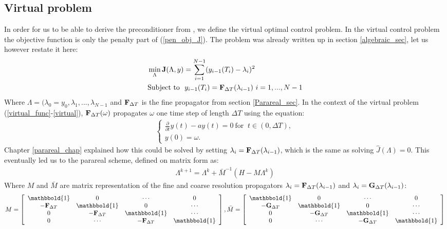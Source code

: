 \subsection{Virtual problem}
In order for us to be able to derive the preconditioner from \cite{maday2002parareal}, we define the virtual optimal control problem. In the virtual control problem the objective function is only the penalty part of (\ref{pen_obj_J}). The problem was already written up in section \ref{algebraic_sec}, let us however restate it here:
\begin{align}
&\min_{\Lambda}\bold{J}(\Lambda,y) = \sum_{i=1}^{N-1} (y_{i-1}(T_{i})-\lambda_{i})^2 \label{virtual_func} \\
&\textrm{Subject to } \ y_{i-1}(T_{i}) = \bold F_{\Delta T}(\lambda_{i-1}) \ i=1,...,N-1 \label{virtual}
\end{align}
Where $\Lambda=(\lambda_0=y_0,\lambda_1,...,\lambda_ {N-1}$ and $\bold F_{\Delta T}$ is the fine propagator from section \ref{Parareal_sec}. In the context of the virtual problem (\ref{virtual_func}-\ref{virtual}), $\bold F_{\Delta T}(\omega)$ propagates $\omega$ one time step of length $\Delta T$ using the equation:
\begin{align}
\left\{
     \begin{array}{lr}
       	\frac{\partial}{\partial t} y(t)-ay(t)=0  \ \textrm{for } \ t\in(0,\Delta T),\\
       	y(0)=\omega.
     \end{array}
   \right. \label{virtual_exs}
\end{align} 
Chapter \ref{parareal_chap} explained how this could be solved by setting $\lambda_i= \bold F_{\Delta T}(\lambda_{i-1})$, which is the same as solving $\hat{J}(\Lambda)=0$. This eventually led us to the parareal scheme, defined on matrix form as:
\begin{align}
\Lambda^{k+1} = \Lambda^k + \bar{M}^{-1}(H-M\Lambda^k)\label{par_mat_sys}
\end{align}
Where $M$ and $\bar{M}$ are matrix representation of the fine and coarse resolution propagators $\lambda_i= \bold F_{\Delta T}(\lambda_{i-1})$ and  $\lambda_i= \bold G_{\Delta T}(\lambda_{i-1})$:
\begin{align*}
M = \left[ \begin{array}{cccc}
   \mathbbold{1} & 0 & \cdots & 0 \\  
   -\bold{F}_{\Delta T} & \mathbbold{1} & 0 & \cdots \\ 
   0 &-\bold{F}_{\Delta T} & \mathbbold{1}  & \cdots \\
   0 &\cdots &-\bold{F}_{\Delta T} & \mathbbold{1}  \\
   \end{array}  \right],
\bar{M} = \left[ \begin{array}{cccc}
   \mathbbold{1} & 0 & \cdots & 0 \\  
   -\bold{G}_{\Delta T} & \mathbbold{1} & 0 & \cdots \\ 
   0 &-\bold{G}_{\Delta T} & \mathbbold{1}  & \cdots \\
   0 &\cdots &-\bold{G}_{\Delta T} & \mathbbold{1}   \\
   \end{array}  \right]
\end{align*}
